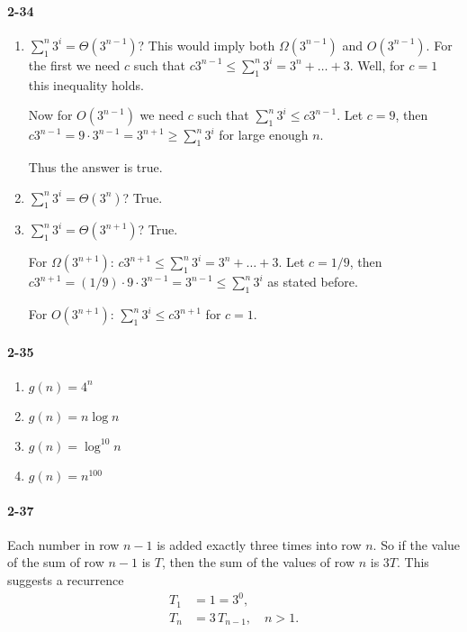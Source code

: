 \documentclass{report}
\begin{document}
\paragraph{2-34}
\begin{enumerate}[label=(\alph*)]
	\item $\sum_1^n 3^i = \Theta(3^{n-1})$? This would imply both $\Omega(3^{n-1})$ and $O(3^{n-1})$. For the first we need $c$ such that $c 3^{n-1} \le \sum_1^n 3^i = 3^n + \ldots + 3$. Well, for $c=1$ this inequality holds.
	
	Now for $O(3^{n-1})$ we need $c$ such that $\sum_1^n 3^i \le c 3^{n-1}$. Let $c=9$, then $c 3^{n-1} = 9\cdot 3^{n-1} = 3^{n+1} \ge \sum_1^n 3^i$ for large enough $n$.
	
	Thus the answer is true.
	
	\item $\sum_1^n 3^i = \Theta(3^n)$? True.
	\item $\sum_1^n 3^i = \Theta(3^{n+1})$? True.
	
	For $\Omega(3^{n+1})$: $c 3^{n+1} \le \sum_1^n 3^i = 3^n + \ldots + 3$. Let $c=1/9$, then $c 3^{n+1} = (1/9)\cdot9\cdot3^{n-1} = 3^{n-1} \le \sum_1^n 3^i$ as stated before.
	
	For $O(3^{n+1})$: $\sum_1^n 3^i \le c 3^{n+1}$ for $c=1$.
\end{enumerate}

\paragraph{2-35}
\begin{enumerate}[label=(\alph*)]
	\item $g(n) = 4^n$
	\item $g(n) = n\log n$
	\item $g(n) = \log^{10} n$
	\item $g(n) = n^{100}$
\end{enumerate}

\paragraph{2-37} Each number in row $n-1$ is added exactly three times into row $n$. So if the value of the sum of row $n-1$ is $T$, then the sum of the values of row $n$ is $3T$. This suggests a recurrence
\begin{align*}
	T_1 &= 1 = 3^0, \\
	T_n &= 3\,T_{n-1},\quad n>1.
\end{align*}
\end{document}
